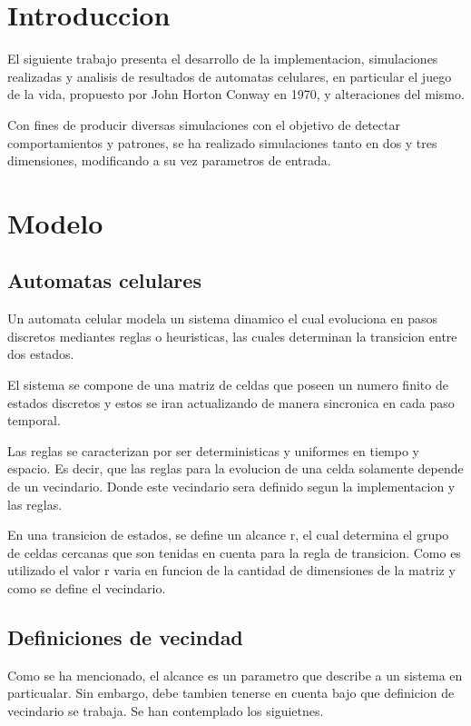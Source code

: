 \documentclass[11pt]{article}
\begin{document}
    \tableofcontents


    \section{Introduccion}\label{sec:introduccion}
    El siguiente trabajo presenta el desarrollo de la implementacion, simulaciones realizadas y analisis de resultados de
    automatas celulares, en particular el juego de la vida, propuesto por John Horton Conway en 1970, y alteraciones del mismo.

    Con fines de producir diversas simulaciones con el objetivo de detectar comportamientos y patrones, se ha realizado
    simulaciones tanto en dos y tres dimensiones, modificando a su vez parametros de entrada.

    \section{Modelo}\label{sec:modelo}

    \subsection{Automatas celulares}\label{subsec:automatas-celulares}

    Un automata celular modela un sistema dinamico el cual evoluciona en pasos discretos mediantes reglas o heuristicas,
     las cuales determinan la transicion entre dos estados.

    El sistema se compone de una matriz de celdas que poseen un numero finito de estados discretos y estos se iran actualizando
    de manera sincronica en cada paso temporal.

    Las reglas se caracterizan por ser deterministicas y uniformes en tiempo y espacio. Es decir, que las reglas para la evolucion
    de una celda solamente depende de un vecindario. Donde este vecindario sera definido segun la implementacion y las reglas.

    En una transicion de estados, se define un alcance r, el cual determina el grupo de celdas cercanas que son tenidas
    en cuenta para la regla de transicion. Como es utilizado el valor r varia en funcion de la cantidad de dimensiones de
    la matriz y como se define el vecindario.

    \subsection{Definiciones de vecindad}\label{subsec:definiciones-de-vecindad}
    Como se ha mencionado, el alcance es un parametro que describe a un sistema en particualar. Sin embargo, debe tambien
    tenerse en cuenta bajo que definicion de vecindario se trabaja. Se han contemplado los siguietnes.
\end{document}
